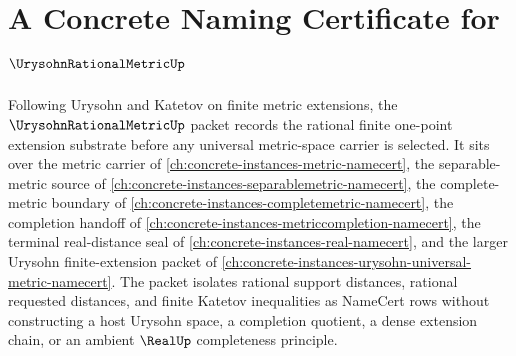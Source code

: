 \chapter{A Concrete Naming Certificate for $\UrysohnRationalMetricUp$}
\label{ch:concrete-instances-urysohn-rational-metric-namecert}

Following Urysohn and Katetov on finite metric extensions, the $\UrysohnRationalMetricUp$ packet records the rational finite one-point extension substrate before any universal metric-space carrier is selected. It sits over the metric carrier of \autoref{ch:concrete-instances-metric-namecert}, the separable-metric source of \autoref{ch:concrete-instances-separablemetric-namecert}, the complete-metric boundary of \autoref{ch:concrete-instances-completemetric-namecert}, the completion handoff of \autoref{ch:concrete-instances-metriccompletion-namecert}, the terminal real-distance seal of \autoref{ch:concrete-instances-real-namecert}, and the larger Urysohn finite-extension packet of \autoref{ch:concrete-instances-urysohn-universal-metric-namecert}. The packet isolates rational support distances, rational requested distances, and finite Katetov inequalities as NameCert rows without constructing a host Urysohn space, a completion quotient, a dense extension chain, or an ambient $\RealUp$ completeness principle.

